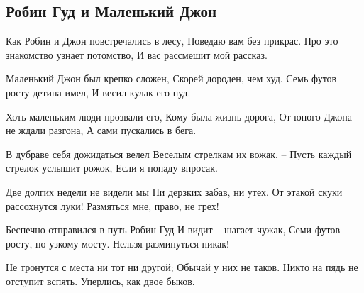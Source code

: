 \subsection*{Робин Гуд и Маленький Джон}

\begin{flushleft}

Как Робин и Джон повстречались в лесу, \linebreak
Поведаю вам без прикрас. \linebreak
Про это знакомство узнает потомство, \linebreak
И вас рассмешит мой рассказ. \linebreak

Маленький Джон был крепко сложен, \linebreak
Скорей дороден, чем худ. \linebreak
Семь футов росту детина имел, \linebreak
И весил кулак его пуд. \linebreak

Хоть маленьким люди прозвали его, \linebreak
Кому была жизнь дорога, \linebreak
От юного Джона не ждали разгона, \linebreak
А сами пускались в бега. \linebreak

В дубраве себя дожидаться велел \linebreak
Веселым стрелкам их вожак. \linebreak
– Пусть каждый стрелок услышит рожок, \linebreak
Если я попаду впросак. \linebreak

Две долгих недели не видели мы \linebreak
Ни дерзких забав, ни утех. \linebreak
От этакой скуки рассохнутся луки! \linebreak
Размяться мне, право, не грех! \linebreak

Беспечно отправился в путь Робин Гуд \linebreak
И видит – шагает чужак, \linebreak
Семи футов росту, по узкому мосту. \linebreak
Нельзя разминуться никак! \linebreak

Не тронутся с места ни тот ни другой; \linebreak
Обычай у них не таков. \linebreak
Никто на пядь не отступит вспять. \linebreak
Уперлись, как двое быков. \linebreak


\end{flushleft}
